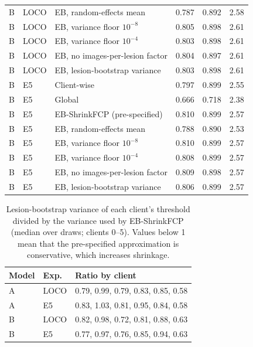 \documentclass[10pt]{article}
\begin{document}
\begin{table}[!htbp]
\begin{tabular}{@{}lllrrr@{}}
B & LOCO & EB, random-effects mean & 0.787 & 0.892 & 2.58 \\
B & LOCO & EB, variance floor $10^{-8}$ & 0.805 & 0.898 & 2.61 \\
B & LOCO & EB, variance floor $10^{-4}$ & 0.803 & 0.898 & 2.61 \\
B & LOCO & EB, no images-per-lesion factor & 0.804 & 0.897 & 2.61 \\
B & LOCO & EB, lesion-bootstrap variance & 0.803 & 0.898 & 2.61 \\
\midrule
B & E5 & Client-wise & 0.797 & 0.899 & 2.55 \\
B & E5 & Global & 0.666 & 0.718 & 2.38 \\
B & E5 & EB-ShrinkFCP (pre-specified) & 0.810 & 0.899 & 2.57 \\
B & E5 & EB, random-effects mean & 0.788 & 0.890 & 2.53 \\
B & E5 & EB, variance floor $10^{-8}$ & 0.810 & 0.899 & 2.57 \\
B & E5 & EB, variance floor $10^{-4}$ & 0.808 & 0.899 & 2.57 \\
B & E5 & EB, no images-per-lesion factor & 0.809 & 0.898 & 2.57 \\
B & E5 & EB, lesion-bootstrap variance & 0.806 & 0.899 & 2.57 \\
\bottomrule
\end{tabular}
\end{table}
\begin{table}[!htbp]
\centering
\scriptsize
\caption{Lesion-bootstrap variance of each client's threshold divided by the variance used by EB-ShrinkFCP (median over draws; clients 0--5). Values below 1 mean that the pre-specified approximation is conservative, which increases shrinkage.}
\label{tab:s15v}
\begin{tabular}{@{}llp{7cm}@{}}
\toprule
Model & Exp. & Ratio by client \\
\midrule
A & LOCO & 0.79, 0.99, 0.79, 0.83, 0.85, 0.58 \\
A & E5 & 0.83, 1.03, 0.81, 0.95, 0.84, 0.58 \\
B & LOCO & 0.82, 0.98, 0.72, 0.81, 0.88, 0.63 \\
B & E5 & 0.77, 0.97, 0.76, 0.85, 0.94, 0.63 \\
\bottomrule
\end{tabular}
\end{table}
\end{document}
